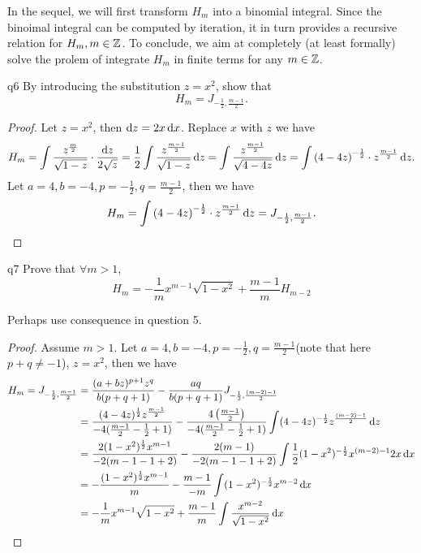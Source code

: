 \documentclass[reqno]{alittlebear}
\begin{document}
\begin{exercise}{}{}
\begin{note}
    In the sequel, we will first transform $H_m$ into a binomial integral. Since the binoimal integral can be computed by iteration, it in turn provides a recursive relation for $H_m,m\in\mathbb{Z}$. To conclude, we aim at completely (at least formally) solve the prolem of integrate $H_m$ in finite terms for any $m\in\mathbb{Z}$. 
\end{note}
\newpage
\begin{question}{}{q6}
    By introducing the substitution $z=x^2$, show that \[H_m=J_{-\frac{1}{2},\frac{m-1}{2}}.\]
    \qbreak
    \begin{proof}
        Let $z=x^2$, then $\mathop{}\!\mathrm{d} z=2x\mathop{}\!\mathrm{d} x$. Replace $x$ with $z$ we have \[\begin{aligned}H_m=\int\frac{z^{\frac{m}{2}}}{\sqrt{1-z}}\cdot\frac{\mathop{}\!\mathrm{d} z}{2\sqrt{z}}=\frac12\int\frac{z^{\frac{m-1}{2}}}{\sqrt{1-z}}\mathop{}\!\mathrm{d} z=\int\frac{z^{\frac{m-1}{2}}}{\sqrt{4-4z}}\mathop{}\!\mathrm{d} z=\int \left(4-4z\right)^{-\frac12}\cdot z^{\frac{m-1}{2}}\mathop{}\!\mathrm{d} z.\end{aligned}\] Let $a=4, b=-4, p=-\frac12, q=\frac{m-1}{2}$, then we have \[H_m=\int \left(4-4z\right)^{-\frac12}\cdot z^{\frac{m-1}{2}}\mathop{}\!\mathrm{d} z=J_{-\frac12,\frac{m-1}{2}}.\]
    \end{proof}
\end{question}
\newpage
\begin{question}{}{q7}
    Prove that $\forall m>1$, \[H_m=-\frac{1}{m}x^{m-1}\sqrt{1-x^2}+\frac{m-1}{m}H_{m-2}\]
    \qbreak
    \begin{hint}
        Perhaps use consequence in question 5.
    \end{hint}
    \begin{proof}
        Assume $m>1.$ Let $a=4, b=-4, p=-\frac12, q=\frac{m-1}{2} $(note that here $p+q\neq-1$), $z=x^2$, then we have
        \begin{align*}
            H_{m}=J_{-\frac{1}{2},\frac{m-1}{2}}&=\frac{(a+bz)^{p+1}z^{q}}{b(p+q+1)}-\frac{aq}{b(p+q+1)}J_{-\frac12, \frac{(m-2)-1}{2}}\\
            &=\frac{(4-4z)^{\frac12}z^{\frac{m-1}{2}}}{-4(\frac{m-1}{2}-\frac12+1)}-\frac{4\bra{\frac{m-1}{2}}}{-4(\frac{m-1}{2}-\frac12+1)}\int (4-4z)^{-\frac12}z^{\frac{(m-2)-1}{2}}\D z\\
            &=\frac{2(1-x^2)^{\frac12}x^{m-1}}{-2(m-1-1+2)}-\frac{2(m-1)}{-2(m-1-1+2)}\int \frac12(1-x^2)^{-\frac12}x^{(m-2)-1}2x\D x\\
            &=-\frac{(1-x^2)^{\frac12}x^{m-1}}{m}-\frac{m-1}{-m}\int (1-x^2)^{-\frac12}x^{m-2}\D x\\
            &=-\frac{1}{m}x^{m-1}\sqrt{1-x^2}+\frac{m-1}{m}\int\frac{x^{m-2}}{\sqrt{1-x^2}}\D x\\

\end{align*}
\end{proof}
\end{question}
\end{exercise}
\end{document}
